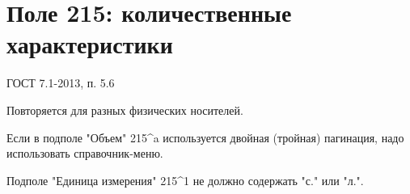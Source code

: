 \chapter{Поле 215: количественные характеристики}

ГОСТ 7.1-2013, п. 5.6

Повторяется для разных физических носителей.

Если в подполе "Объем" 215\^{}a используется двойная (тройная) пагинация, надо использовать справочник-меню.

Подполе "Единица измерения" 215\^{}1 не должно содержать "с." или "л.".
